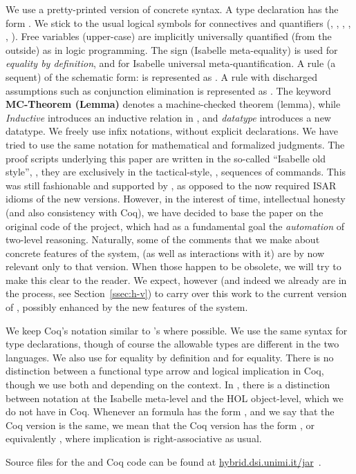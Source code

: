\documentclass[final]{svjour3}
\begin{document}
 \begin{notation}[\HOL]  
   We use a pretty-printed version of \HOL concrete syntax. A type
   declaration has the form \mbox{}.  We stick to the usual logical symbols for \HOL
   connectives and quantifiers (, , , ,
   , ).  Free variables (upper-case) are implicitly
   universally quantified (from the outside) as in logic programming.
   The sign  (Isabelle meta-equality) is used for
   \emph{equality by definition}, and  for Isabelle universal
   meta-quantification.  A rule (a sequent) of the schematic form:  is represented as . A rule with discharged assumptions such as conjunction
   elimination is represented as .  The keyword \textbf{MC-Theorem (Lemma)}
   denotes a machine-checked theorem (lemma), while \emph{Inductive}
   introduces an inductive relation in \HOL, and
   \emph{datatype} introduces a new datatype.
   We freely use infix notations, without explicit declarations.  We
   have tried to use the same notation for mathematical and formalized
   judgments. The proof scripts underlying this paper are written in
   the so-called ``Isabelle old style'', \ie, they are exclusively in
   the tactical-style, \eg, sequences of
   commands. This was still fashionable and supported by , as
   opposed to the now required ISAR \cite{ISAR} idioms of the new \HOL
   versions.  However, in the interest of time, intellectual honesty
   (and also consistency with Coq), we have decided to base the paper
   on the original code of the project, which had as a fundamental
   goal the \emph{automation} of two-level reasoning.  Naturally, some
   of the comments that we make about concrete features of the system,
   (as well as interactions with it) are by now relevant only to that
   version. When those happen to be obsolete, we will try to make this
   clear to the reader. We expect, however (and indeed we already are
   in the process, see Section~\ref{ssec:h-v}) to carry over this work
   to the current version of \HOL, possibly enhanced by the new
   features of the system.
 \end{notation}

\begin{notation}[Coq]
  We keep Coq's notation similar to \HOL's where possible.  We use the
  same syntax for type declarations, though of course the allowable
  types are different in the two languages.  We also use  for
  equality by definition and  for equality.  There is no
  distinction between a functional type arrow and logical implication
  in Coq, though we use both  and  depending on the
  context.  In \HOL, there is a distinction between notation at the
  Isabelle meta-level and the HOL object-level, which we do not have
  in Coq. Whenever an \HOL formula has the form , and we say that the Coq version is the same, we
  mean that the Coq version has the form , or equivalently , where
  implication is right-associative as usual.
\end{notation}
Source files for the \HOL and Coq code can be found at
\url{hybrid.dsi.unimi.it/jar}~\cite{Hybrid}.
\end{document}

